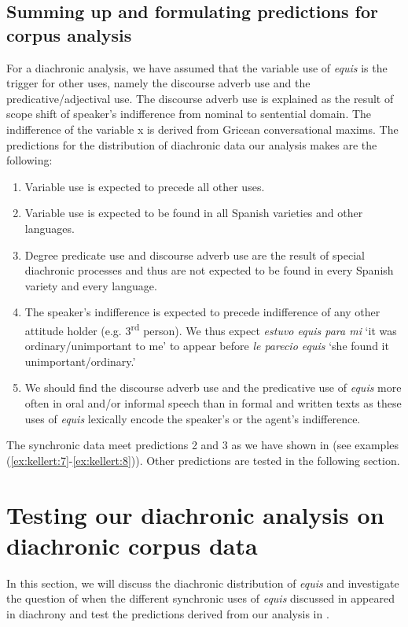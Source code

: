 \documentclass[output=paper
,modfonts
,nonflat]{langsci/langscibook}
\begin{document}
\subsection{Summing up and formulating predictions for corpus analysis}\label{sec:kellert:4.3}
For a diachronic analysis, we have assumed that the variable use of \textit{equis} is the trigger for other uses, namely the discourse adverb use and the predicative/adjectival use. The discourse adverb use is explained as the result of scope shift of speaker’s indifference from nominal to sentential domain. The indifference of the variable x is derived from Gricean conversational maxims. The predictions for the distribution of diachronic data our analysis makes are the following:

\begin{enumerate}
	\item Variable use is expected to precede all other uses.
	\item Variable use is expected to be found in all Spanish varieties and other languages.
	\item Degree predicate use and discourse adverb use are the result of special diachronic processes and thus are not expected to be found in every Spanish variety and every language.
	\item The speaker’s indifference is expected to precede indifference of any other attitude holder (e.g. 3\textsuperscript{rd} person). We thus expect \textit{estuvo equis para mi} ‘it was ordinary/unimportant to me’ to appear before \textit{le parecio equis} ‘she found it unimportant/ordinary.’
	\item We should find the discourse adverb use and the predicative use of \textit{equis} more often in oral and/or informal speech than in formal and written texts as these uses of \textit{equis} lexically encode the speaker’s or the agent’s indifference.
\end{enumerate}

The synchronic data meet predictions 2 and 3 as we have shown in  (see examples (\ref{ex:kellert:7}-\ref{ex:kellert:8})). Other predictions are tested in the following section.

\section{Testing our diachronic analysis on diachronic corpus data}\label{sec:kellert:5}
In this section, we will discuss the diachronic distribution of \textit{equis} and investigate the question of when the different synchronic uses of \textit{equis} discussed in  appeared in diachrony and test the predictions derived from our analysis in .
\end{document}
